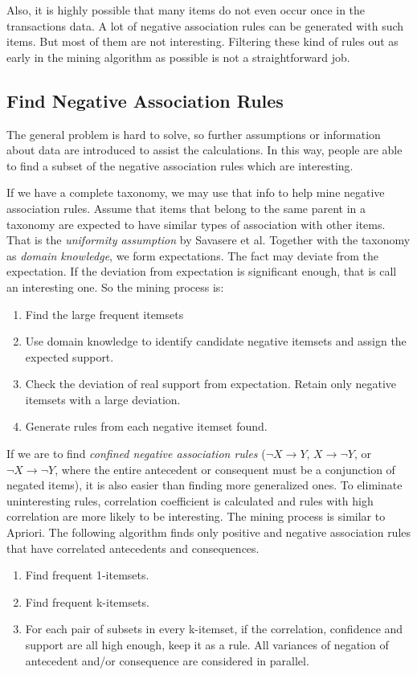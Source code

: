 \documentclass[12pt]{article}
\begin{document}
Also, it is highly possible that many items do not even occur once in the transactions data. A lot of negative association rules can be generated with such items. But most of them are not interesting. Filtering these kind of rules out as early in the mining algorithm as possible is not a straightforward job.

\subsection{Find Negative Association Rules} %
\label{sub:find_negative_association_rules}
The general problem is hard to solve, so further assumptions or information about data are introduced to assist the calculations. In this way, people are able to find a subset of the negative association rules which are interesting.

If we have a complete taxonomy, we may use that info to help mine negative association rules. Assume that items that belong to the same parent in a taxonomy are expected to have similar types of association with other items. That is the \emph{uniformity assumption} by Savasere et al. Together with the taxonomy as \emph{domain knowledge}, we form expectations. The fact may deviate from the expectation. If the deviation from expectation is significant enough, that is call an interesting one. So the mining process is:
\begin{enumerate}
	\item Find the large frequent itemsets
	\item Use domain knowledge to identify candidate negative itemsets and assign the expected support.
	\item Check the deviation of real support from expectation. Retain only negative itemsets with a large deviation.
	\item Generate rules from each negative itemset found.
\end{enumerate}

If we are to find \emph{confined negative association rules} ($\neg X \rightarrow Y$, $X \rightarrow \neg Y$, or $\neg X \rightarrow \neg Y$, where the entire antecedent or consequent must be a conjunction of negated items), it is also easier than finding more generalized ones. To eliminate uninteresting rules, correlation coefficient is calculated and rules with high correlation are more likely to be interesting. The mining process is similar to Apriori. The following algorithm finds only positive and negative association rules that have correlated antecedents and consequences.
\begin{enumerate}
	\item Find frequent 1-itemsets.
	\item Find frequent k-itemsets.
	\item For each pair of subsets in every k-itemset, if the correlation, confidence and support are all high enough, keep it as a rule. All variances of negation of antecedent and/or consequence are considered in parallel.
\end{enumerate}
\end{document}
